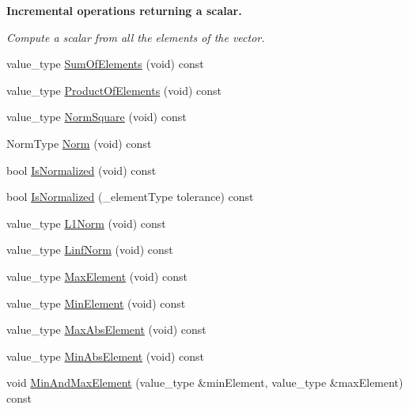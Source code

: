 \begin{Indent}{\bf Incremental operations returning a scalar.}\par
{\em Compute a scalar from all the elements of the vector. }\begin{DoxyCompactItemize}
\item 
value\-\_\-type \hyperlink{classvct_dynamic_const_vector_base_a8a06cb87f0416634404a756b08884d65}{Sum\-Of\-Elements} (void) const 
\item 
value\-\_\-type \hyperlink{classvct_dynamic_const_vector_base_a6b7a5255aa05d0037f5b1537a5ff9633}{Product\-Of\-Elements} (void) const 
\item 
value\-\_\-type \hyperlink{classvct_dynamic_const_vector_base_a4beba8c7aca463ad309b247751feac47}{Norm\-Square} (void) const 
\item 
Norm\-Type \hyperlink{classvct_dynamic_const_vector_base_ab3f2a857534d2efd65b7b2a02f6d7a89}{Norm} (void) const 
\item 
bool \hyperlink{classvct_dynamic_const_vector_base_a826dfe65ac82e97d608eb8ddf06757da}{Is\-Normalized} (void) const 
\item 
bool \hyperlink{classvct_dynamic_const_vector_base_adacfbde73572750f96c9adaf9b631d51}{Is\-Normalized} (\-\_\-element\-Type tolerance) const 
\item 
value\-\_\-type \hyperlink{classvct_dynamic_const_vector_base_a0af436d0aeea56d44e6b242be1639959}{L1\-Norm} (void) const 
\item 
value\-\_\-type \hyperlink{classvct_dynamic_const_vector_base_a34e41ecfe2adfbfe14c66c925cac3c1b}{Linf\-Norm} (void) const 
\item 
value\-\_\-type \hyperlink{classvct_dynamic_const_vector_base_ae909aabd2f49189f0a4a711eab0daeac}{Max\-Element} (void) const 
\item 
value\-\_\-type \hyperlink{classvct_dynamic_const_vector_base_aefff21217e21e08394c56290361612bf}{Min\-Element} (void) const 
\item 
value\-\_\-type \hyperlink{classvct_dynamic_const_vector_base_a038efc5bac847da3c24ac3f8e6e21826}{Max\-Abs\-Element} (void) const 
\item 
value\-\_\-type \hyperlink{classvct_dynamic_const_vector_base_a789ec4b2308dff10c7c5d464f4b0647c}{Min\-Abs\-Element} (void) const 
\item 
void \hyperlink{classvct_dynamic_const_vector_base_ace535a9eb14e3809f875e295946634a0}{Min\-And\-Max\-Element} (value\-\_\-type \&min\-Element, value\-\_\-type \&max\-Element) const 
\item 

\end{DoxyCompactItemize}
\end{Indent}
